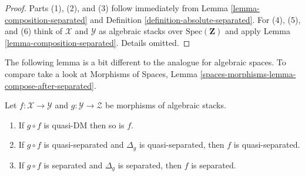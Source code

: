 \begin{proof}
Parts (1), (2), and (3) follow immediately from 
Lemma \ref{lemma-composition-separated}
and
Definition \ref{definition-absolute-separated}.
For (4), (5), and (6) think of $\mathcal{X}$ and $\mathcal{Y}$ as
algebraic stacks over $\text{Spec}(\mathbf{Z})$ and apply
Lemma \ref{lemma-composition-separated}.
Details omitted.
\end{proof}

\noindent
The following lemma is a bit different to the analogue for algebraic
spaces. To compare take a look at
Morphisms of Spaces,
Lemma \ref{spaces-morphisms-lemma-compose-after-separated}.

\begin{lemma}
\label{lemma-compose-after-separated}
Let $f : \mathcal{X} \to \mathcal{Y}$ and
$g : \mathcal{Y} \to \mathcal{Z}$ be morphisms of algebraic stacks.
\begin{enumerate}
\item If $g \circ f$ is quasi-DM then so is $f$.
\item If $g \circ f$ is quasi-separated and
$\Delta_g$ is quasi-separated, then $f$ is quasi-separated.
\item If $g \circ f$ is separated and $\Delta_g$ is separated, then
$f$ is separated.
\end{enumerate}
\end{lemma}

